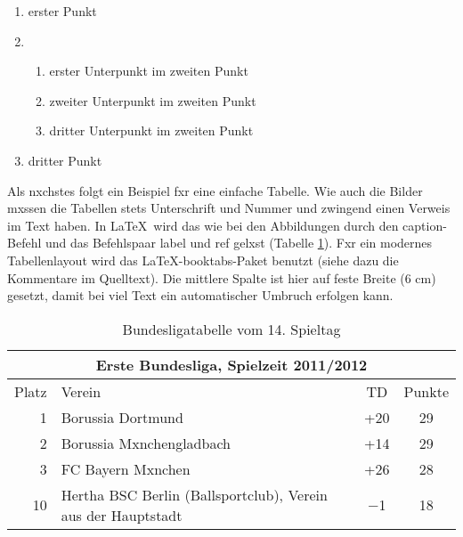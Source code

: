             \begin{enumerate}\setlength{\itemsep}{0ex}
                \item erster Punkt
                \item 
                    \begin{enumerate}\setlength{\itemsep}{-0.5ex}
                    \item erster Unterpunkt im zweiten Punkt
                    \item zweiter Unterpunkt im zweiten Punkt
                    \item dritter Unterpunkt im zweiten Punkt
                    \end{enumerate}
                \item dritter Punkt
            \end{enumerate}

            Als nxchstes folgt ein Beispiel fxr eine einfache Tabelle. Wie auch die Bilder mxssen die Tabellen stets Unterschrift und Nummer und zwingend einen Verweis im Text haben. In \LaTeX\ wird das wie bei den Abbildungen durch den caption-Befehl und das Befehlspaar label und ref gelxst (Tabelle \ref{t_buli}). Fxr ein modernes Tabellenlayout wird das \LaTeX-booktabs-Paket benutzt (siehe dazu die Kommentare im Quelltext). Die mittlere Spalte ist hier auf feste Breite (6 cm) gesetzt, damit bei viel Text ein automatischer Umbruch erfolgen kann.

            \begin{table}[htp] 
                \centering
                \begin{tabular}{r|p{6cm}|c|c}  %
                    \toprule
                    \multicolumn{4}{c}{\large\bfseries Erste Bundesliga, Spielzeit 2011/2012}\\ \midrule
                        Platz & Verein & TD & Punkte\\ \midrule
                        1 & Borussia Dortmund & +20 & 29\\ \midrule
                        2 & Borussia Mxnchengladbach & +14 & 29\\ \midrule
                        3 & FC Bayern Mxnchen & +26 & 28\\ \midrule
                        10 & Hertha BSC Berlin (Ballsportclub), Verein aus der Hauptstadt & $-$1 & 18 \\
                    \bottomrule
                \end{tabular}
                \caption{Bundesligatabelle vom 14. Spieltag}\label{t_buli}
            \end{table}

